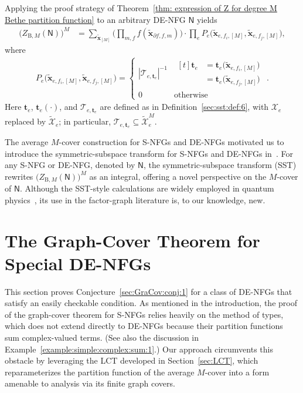 \documentclass[journal]{IEEEtran}
\newcommand{\add}[1]{{\color{black}#1}}
\newcommand{\vect}[1]{ \bm{#1} }
\newcommand{\set}[1]{\mathcal{#1}}
\newcommand{\vt}{ \vect{t} }
\newcommand{\graphN}{ \mathsf{N} }
\newcommand{\ZBM}{ Z_{\mathrm{B},M} }
\newcommand{\tset}[1]{\tilde{\mathcal{#1}}}
\newcommand{\efi}{ e,f_i }
\newcommand{\efj}{ e,f_j }
\newcommand{\setpff}{ \partial f, f }
\newcommand{\tvx}{ \tilde{\vect{x}}  }
\begin{document}
\add{Applying the proof strategy of Theorem~\ref{thm: expression of Z for degree M Bethe partition function} to an arbitrary DE-NFG $\graphN$ yields}
\begin{align}
  \bigl( \ZBM(\graphN) \bigr)^{\! M}
   & \!\!\! =\!\!
  \sum_{\tvx_{[M]}}\!
  \Biggl( \prod_{m ,f} f(\tvx_{\setpff,m}) \!\! \Biggr) \!\!\cdot \! \prod_{e} \!P_e\bigl( \tvx_{\efi,[M]}, \tvx_{\efj,[M]} \bigr),
  \label{eqn: Z for degree M average cover of DENFG}
\end{align}
where
\begin{align*}
  P_e\bigl( \tvx_{\efi,[M]}, \tvx_{\efj,[M]} \bigr)
  = \begin{cases}
      |\set{T}_{e,\vt_e}|^{-1}
       &
      \begin{aligned}[t]
        \vt_e & = \vt_e\bigl(\tvx_{\efi,[M]}\bigr)   \\
              & = \vt_e\bigl( \tvx_{\efj,[M]} \bigr)
      \end{aligned} \\
      0
       & \text{otherwise}
    \end{cases}.
\end{align*}
Here $\vt_e$, $\vt_e(\cdot)$, and $\set{T}_{e,\vt_e}$ are defined as in
Definition~\ref{sec:sst:def:6}, with $\set{X}_e$ replaced by
$\tset{X}_e$; in particular, $\set{T}_{e,\vt_e}\subseteq\tset{X}_e^M$.

The average \add{$M$-cover construction for S-NFGs and DE-NFGs} motivated us
to introduce the symmetric-subspace transform \add{for S-NFGs and DE-NFGs}
in~\cite[Chapter 5]{Huang2024}. For any S-NFG or DE-NFG, denoted by
$ \graphN $, the symmetric-subspace transform (SST) rewrites
$ \bigl( \ZBM( \graphN ) \bigr)^{\! M} $ as an integral, offering a novel
perspective on the \add{$M$-cover} of $ \graphN $. Although the SST-style
calculations are widely employed in quantum
physics~\cite{Wood2015,Harrow2013}, \add{its use in the factor-graph
  literature is, to our knowledge, new.}

\section{The Graph-Cover Theorem for Special DE-NFGs} \label{sec:CheckCon}

\add{This section proves Conjecture~\ref{sec:GraCov:conj:1} for a class of
  DE-NFGs that satisfy an easily checkable condition.} As mentioned in the
introduction, the proof of the graph-cover theorem for S-NFGs relies heavily
on the method of types, \add{which does not extend directly to DE-NFGs because
  their partition functions sum complex-valued terms. (See also the discussion
  in Example~\ref{example:simple:complex:sum:1}.)} Our approach circumvents
this obstacle by leveraging the LCT developed in Section~\ref{sec:LCT}, which
reparameterizes the partition function of the average $M$-cover into a form
amenable to analysis via its finite graph covers.
\end{document}

